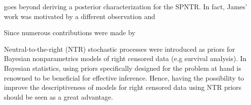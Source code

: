 goes beyond deriving a posterior characterization for the SPNTR. In fact, James' work was motivated by a different observation and  


Since numerous contributions were made by \cite{james2006poisson}

Neutral-to-the-right (NTR) stochastic processes \cite{doksum1974tailfree} were introduced as priors for Bayesian nonparametrics models of right censored data (e.g survival analysis). In Bayesian statistics, using priors specifically designed for the problem at hand is renowned to be beneficial for effective inference. Hence, having the possibility to improve the descriptiveness of models for right censored data using NTR priors should be seen as a great advantage. 

